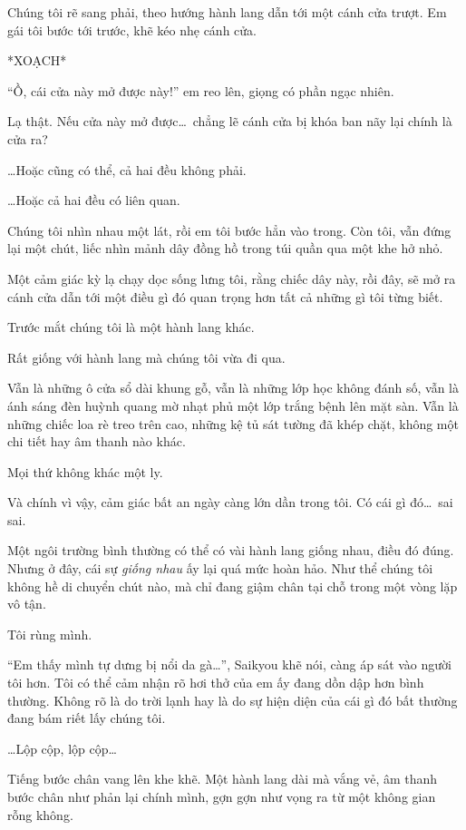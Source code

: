 \documentclass[../main.tex]{subfiles}
\begin{document}
Chúng tôi rẽ sang phải, theo hướng hành lang dẫn tới một cánh cửa trượt. Em gái tôi bước tới trước, khẽ kéo nhẹ cánh cửa.

*XOẠCH*

``Ồ, cái cửa này mở được này!'' em reo lên, giọng có phần ngạc nhiên.

Lạ thật. Nếu cửa này mở được\dots\ chẳng lẽ cánh cửa bị khóa ban nãy lại chính là cửa ra?

\dots Hoặc cũng có thể, cả hai đều không phải.

\dots Hoặc cả hai đều có liên quan.

Chúng tôi nhìn nhau một lát, rồi em tôi bước hẳn vào trong. Còn tôi, vẫn đứng lại một chút, liếc nhìn mảnh dây đồng hồ trong túi quần qua một khe hở nhỏ.

Một cảm giác kỳ lạ chạy dọc sống lưng tôi, rằng chiếc dây này, rồi đây, sẽ mở ra cánh cửa dẫn tới một điều gì đó quan trọng hơn tất cả những gì tôi từng biết.

\ct

Trước mắt chúng tôi là một hành lang khác.

Rất giống với hành lang mà chúng tôi vừa đi qua.

Vẫn là những ô cửa sổ dài khung gỗ, vẫn là những lớp học không đánh số, vẫn là ánh sáng đèn huỳnh quang mờ nhạt phủ một lớp trắng bệnh lên mặt sàn. Vẫn là những chiếc loa rè treo trên cao, những kệ tủ sát tường đã khép chặt, không một chi tiết hay âm thanh nào khác.

Mọi thứ không khác một ly.

Và chính vì vậy, cảm giác bất an ngày càng lớn dần trong tôi. Có cái gì đó\dots\ sai sai.

Một ngôi trường bình thường có thể có vài hành lang giống nhau, điều đó đúng. Nhưng ở đây, cái sự \emph{giống nhau} ấy lại quá mức hoàn hảo. Như thể chúng tôi không hề di chuyển chút nào, mà chỉ đang giậm chân tại chỗ trong một vòng lặp vô tận.

Tôi rùng mình.

``Em thấy mình tự dưng bị nổi da gà\dots'', Saikyou khẽ nói, càng áp sát vào người tôi hơn. Tôi có thể cảm nhận rõ hơi thở của em ấy đang dồn dập hơn bình thường. Không rõ là do trời lạnh hay là do sự hiện diện của cái gì đó bất thường đang bám riết lấy chúng tôi.

\dots Lộp cộp, lộp cộp\dots

Tiếng bước chân vang lên khe khẽ. Một hành lang dài mà vắng vẻ, âm thanh bước chân như phản lại chính mình, gợn gợn như vọng ra từ một không gian rỗng không.
\end{document}
